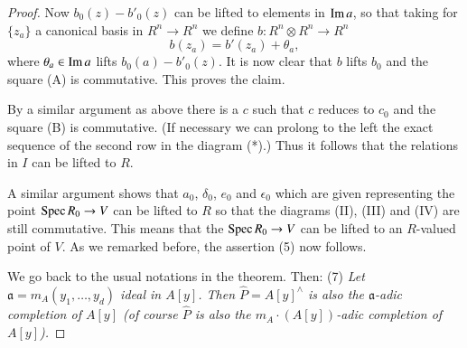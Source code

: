 \begin{proof}
Now $b_{0}(z)-b'_{0}(z)$ can be lifted to elements in $\operatorname{Im} a$, so
that taking for $\{z_{a}\}$ a canonical basis in $R^{n}\to R^{n}$ we
define $b:R^{n}\otimes R^{n}\to R^{n}$
$$
b(z_{a})=b'(z_{a})+\theta_{a},
$$
where $\theta_{a}\in \operatorname{Im} a$ lifts $b_{0}(a)-b'_{0}(z)$. It is now
clear that $b$ lifts $b_{0}$ and the square (A) is commutative. This
proves the claim.

By a similar argument as above there is a $c$ such that $c$ reduces to
$c_{0}$ and the square (B) is commutative. (If necessary we can
prolong to the left the exact sequence of the second row in the
diagram (*).) Thus it follows that the relations in $I$ can be lifted
to $R$.

A similar argument shows that $a_{0}$, $\delta_{0}$, $e_{0}$ and
$\epsilon_{0}$ which are given representing the point $\operatorname{Spec} R_{0}\to
V$ can be lifted to $R$ so that the diagrams (II), (III) and (IV) 
are still commutative. This means that the $\operatorname{Spec} R_{0}\to V$ can be
lifted to an $R$-valued point of $V$. As we remarked before, the
assertion (5) now follows.

We go back to the usual notations in the theorem. Then: (7) {\em Let
  $\mathfrak{a}=m_{A}(y_{1},\ldots,y_{d})$ ideal in $A[y]$. Then
  $\hat{P}=A[y]^{\wedge}$ is also the $\mathfrak{a}$-adic completion of
  $A[y]$ (of course $\hat{P}$ is also the $m_{A}\cdot (A[y])$-adic
  completion of $A[y]$).}


\end{proof}
